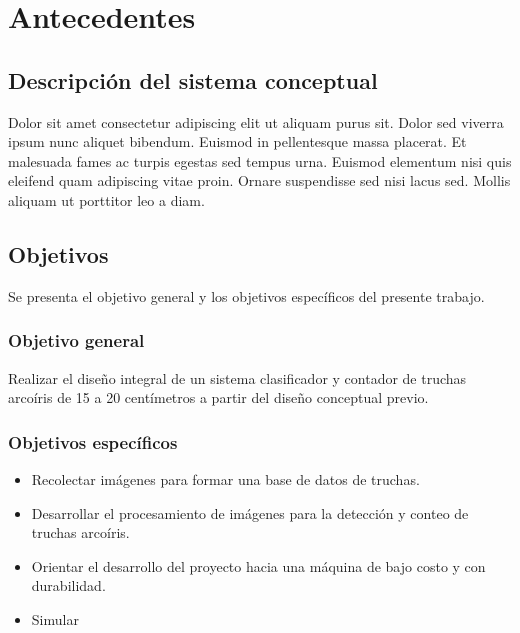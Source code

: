 
\pagestyle{myportland}
\doublespacing
\chapter[----- Antecedentes]{Antecedentes}
\thispagestyle{myportland}

\section{Descripción del sistema conceptual}
\label{sec:descripcion del sistema conceptual}

Dolor sit amet consectetur adipiscing elit ut aliquam purus sit. Dolor sed viverra ipsum nunc aliquet bibendum. Euismod in pellentesque massa placerat. Et malesuada fames ac turpis egestas sed tempus urna. Euismod elementum nisi quis eleifend quam adipiscing vitae proin. Ornare suspendisse sed nisi lacus sed. Mollis aliquam ut porttitor leo a diam.

\section{Objetivos}

Se presenta el objetivo general y los objetivos específicos del presente trabajo.

\subsection{Objetivo general}

Realizar el diseño integral de un sistema clasificador y contador de truchas arcoíris de 15 a 20 centímetros a partir del diseño conceptual previo.

\subsection{Objetivos específicos}

\begin{itemize}
	\item Recolectar imágenes para formar una base de datos de truchas.
	\item Desarrollar el procesamiento de imágenes para la detección y conteo de truchas arcoíris.
	\item Orientar el desarrollo del proyecto hacia una máquina de bajo costo y con durabilidad.
	\item Simular 	
	
\end{itemize}



